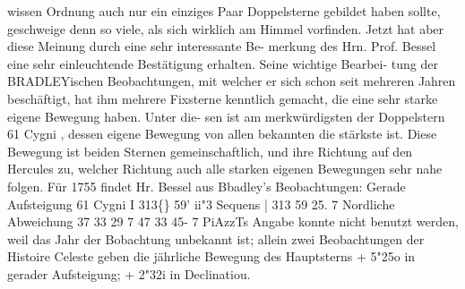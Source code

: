 \documentclass[12pt,a4paper]{article}
\newcommand{\degree}{\textdegree}
\begin{document}
wissen Ordnung  auch  nur  ein  einziges  Paar  Doppelsterne  gebildet  haben  sollte,  geschweige  denn  so  viele, 
als  sich  wirklich  am  Himmel  vorfinden.  Jetzt  hat  aber  diese  Meinung  durch  eine  sehr  interessante  Be- 
merkung des  Hrn.  Prof.  Bessel  eine  sehr  einleuchtende  Bestätigung  erhalten.  Seine  wichtige  Bearbei- 
tung der  BRADLEYischen  Beobachtungen,  mit  welcher  er  sich  schon  seit  mehreren  Jahren  beschäftigt, 
hat  ihm  mehrere  Fixsterne  kenntlich  gemacht,  die  eine  sehr  starke  eigene  Bewegung  haben.  Unter  die- 
sen ist  am  merkwürdigsten  der  Doppelstern  61  Cygni ,  dessen  eigene  Bewegung  von  allen  bekannten  die 
stärkste  ist.  Diese  Bewegung  ist  beiden  Sternen  gemeinschaftlich,  und  ihre  Richtung  auf  den  Hercules 
zu,  welcher  Richtung  auch  alle  starken  eigenen  Bewegungen  sehr  nahe  folgen.  Für  1755  findet  Hr. 
Bessel  aus  Bbadley's  Beobachtungen: 
Gerade 
Aufsteigung 
61  Cygni     I     313\degree\{\}  59'   ii"3 
Sequens     |     313    59    25. 7 
Nordliche 
Abweichung 
37    33     29  7 
47     33    45- 7 
PiAzzTs  Angabe  konnte  nicht  benutzt  werden,  weil  das  Jahr  der  Bobachtung  unbekannt  ist;  allein  zwei 
Beobachtungen  der  Histoire  Celeste  geben  die  jährliche  Bewegung  des  Hauptsterns 
+  5"25o  in  gerader  Aufsteigung;     +  2"32i  in  Declinatiou. 


\newpage
\end{document}
